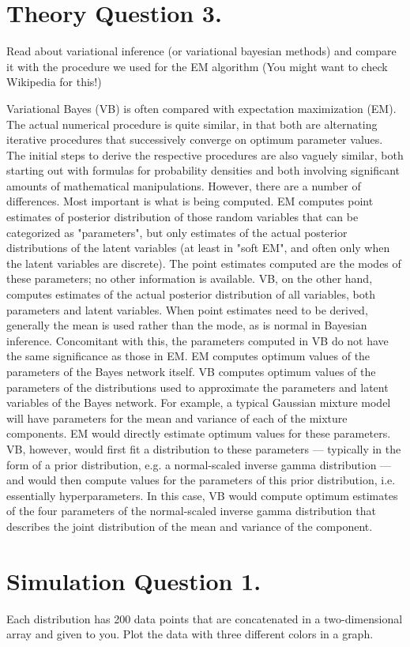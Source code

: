 \documentclass[12pt]{article}
\begin{document}
\section{Theory Question 3.}
Read about variational inference (or variational bayesian methods) and compare it with the procedure we used for the EM algorithm (You might want to check Wikipedia for this!)
\begin{qsolve}[solution]
    Variational Bayes (VB) is often compared with expectation maximization (EM). The actual numerical procedure is quite similar, in that both are alternating iterative procedures that successively converge on optimum parameter values. The initial steps to derive the respective procedures are also vaguely similar, both starting out with formulas for probability densities and both involving significant amounts of mathematical manipulations. However, there are a number of differences. Most important is what is being computed. EM computes point estimates of posterior distribution of those random variables that can be categorized as "parameters", but only estimates of the actual posterior distributions of the latent variables (at least in "soft EM", and often only when the latent variables are discrete). The point estimates computed are the modes of these parameters; no other information is available. VB, on the other hand, computes estimates of the actual posterior distribution of all variables, both parameters and latent variables. When point estimates need to be derived, generally the mean is used rather than the mode, as is normal in Bayesian inference. Concomitant with this, the parameters computed in VB do not have the same significance as those in EM. EM computes optimum values of the parameters of the Bayes network itself. VB computes optimum values of the parameters of the distributions used to approximate the parameters and latent variables of the Bayes network. For example, a typical Gaussian mixture model will have parameters for the mean and variance of each of the mixture components. EM would directly estimate optimum values for these parameters. VB, however, would first fit a distribution to these parameters — typically in the form of a prior distribution, e.g. a normal-scaled inverse gamma distribution — and would then compute values for the parameters of this prior distribution, i.e. essentially hyperparameters. In this case, VB would compute optimum estimates of the four parameters of the normal-scaled inverse gamma distribution that describes the joint distribution of the mean and variance of the component.
\end{qsolve}
\clearpage


\section{Simulation Question 1.}
Each distribution has 200 data points that are concatenated in a two-dimensional array and given to you. Plot the data with three different colors in a graph.
\begin{qsolve}
    code is in \href{
\end{qsolve}














\makeendpage
\end{document}
